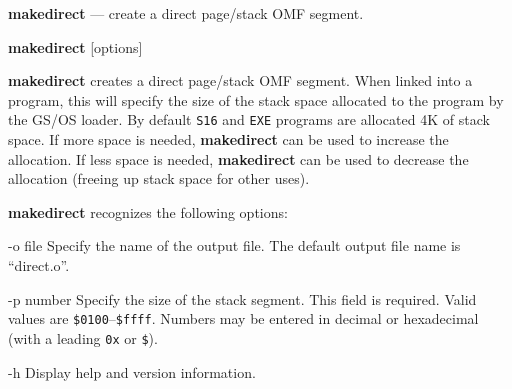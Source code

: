 \documentclass{article}
\def\makedirect{\textbf{makedirect} }
\begin{document}
\makedirect --- create a direct page/stack OMF segment.


\makedirect [options]


\makedirect creates a direct page/stack OMF segment.  When linked into a program, this will
specify the size of the stack space allocated to the program by the GS/OS loader.  By default \texttt{S16} and \texttt{EXE} programs are allocated 4K of stack space.  If more space 
is needed, 
\makedirect can be used to increase the allocation.  If less space is needed, \makedirect
can be used to decrease the allocation (freeing up stack space for other uses).



\makedirect recognizes the following options:
\begin{optionlist}
	\item [-o file]
	Specify the name of the output file.  The default output file name is ``direct.o''.
	\item [-p number]
	Specify the size of the stack segment.  This field is required.  Valid values are 
	\texttt{\$0100}--\texttt{\$ffff}. Numbers may be entered in decimal or hexadecimal 
	(with a leading \texttt{0x} or \texttt{\$}).
	\item [-h]
	Display help and version information.
	
\end{optionlist}
\end{document}
